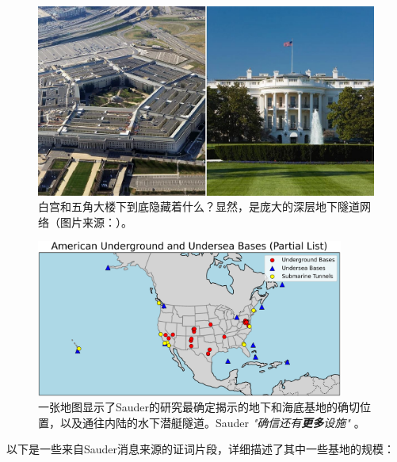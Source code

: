 \documentclass[10pt,twocolumn,letterpaper]{article}
\begin{document}
\begin{figure}[b]
\begin{center}
   \includegraphics[width=1\linewidth]{penta.jpg}
\end{center}
   \caption{白宫和五角大楼下到底隐藏着什么？显然，是庞大的深层地下隧道网络（图片来源：\cite{31}）。}
\label{fig:3}
\label{fig:onecol}
\end{figure}

\begin{figure}[t]
\begin{center}
\includegraphics[width=0.9\textwidth]{basescrop.png}
\end{center}
   \caption{一张地图显示了Sauder的研究最确定揭示的地下和海底基地的确切位置，以及通往内陆的水下潜艇隧道。Sauder \textit{"确信还有\textbf{更多}设施"} \cite{22}。}
   \label{fig:4}
\end{figure}

以下是一些来自Sauder消息来源的证词片段，详细描述了其中一些基地的规模：
\end{document}
